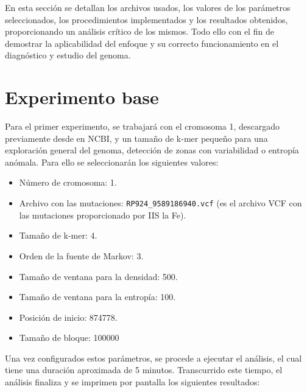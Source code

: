 \documentclass[11pt,spanish,listoffigures,listoftables]{tfgetsinf}
\begin{document}
En esta sección se detallan los archivos usados, los valores de los parámetros seleccionados, los procedimientos implementados y los resultados obtenidos, proporcionando un análisis crítico de los mismos. Todo ello con el fin de demostrar la aplicabilidad del enfoque y su correcto funcionamiento en el diagnóstico y estudio del genoma.  

\section{Experimento base}

Para el primer experimento, se trabajará con el cromosoma 1, descargado previamente desde en NCBI, y un tamaño de k-mer pequeño para una exploración general del genoma, detección de zonas con variabilidad o entropía anómala. Para ello se seleccionarán los siguientes valores: 

\begin{itemize}
   \item Número de cromosoma: 1.
   \item Archivo con las mutaciones: \texttt{RP924\_9589186940.vcf}  (es el archivo VCF con las mutaciones proporcionado por IIS la Fe).
   \item Tamaño de k-mer: 4.
   \item Orden de la fuente de Markov: 3.
   \item Tamaño de ventana para la densidad: 500.
   \item Tamaño de ventana para la entropía: 100.
   \item Posición de inicio: 874778.
   \item Tamaño de bloque: 100000 
\end{itemize}
 

Una vez configurados estos parámetros, se procede a ejecutar el análisis, el cual tiene una duración aproximada de 5 minutos. Transcurrido este tiempo, el análisis finaliza y se imprimen por pantalla los siguientes resultados:
\end{document}
